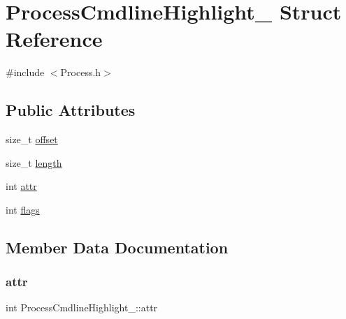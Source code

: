 \hypertarget{structProcessCmdlineHighlight__}{}\section{Process\+Cmdline\+Highlight\+\_\+ Struct Reference}
\label{structProcessCmdlineHighlight__}


{\ttfamily \#include $<$Process.\+h$>$}

\subsection*{Public Attributes}
\begin{DoxyCompactItemize}
\item 
size\+\_\+t \hyperlink{structProcessCmdlineHighlight___a6734d27d349aa9219812edd7585cfa4b}{offset}
\item 
size\+\_\+t \hyperlink{structProcessCmdlineHighlight___ae778dea81e07995db0a0a03e78c36eb9}{length}
\item 
int \hyperlink{structProcessCmdlineHighlight___ac28c73794c382024b9b03d03d32ccf95}{attr}
\item 
int \hyperlink{structProcessCmdlineHighlight___ae34b38795c54c96eed7845557e9e9f7c}{flags}
\end{DoxyCompactItemize}


\subsection{Member Data Documentation}
\mbox{\label{structProcessCmdlineHighlight___ac28c73794c382024b9b03d03d32ccf95}} 
\subsubsection{\texorpdfstring{attr}{attr}}
{\footnotesize\ttfamily int Process\+Cmdline\+Highlight\+\_\+\+::attr}

\mbox{\label{structProcessCmdlineHighlight___ae34b38795c54c96eed7845557e9e9f7c}} 
